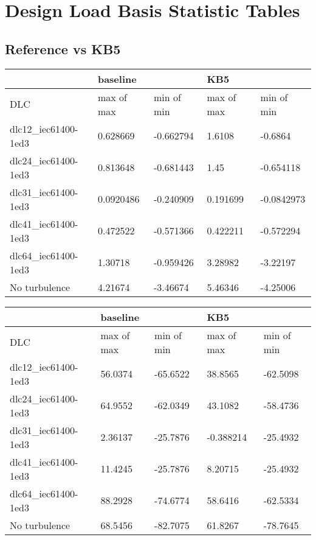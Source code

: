 \newpage
\chapter{Design Load Basis Statistic Tables}
\section{Reference vs KB5}
\label{tables:baseline-vs-KB6}

\begin{tabular}{lllll}
\toprule
                     & \multicolumn{2}{l}{baseline} &         KB5 &\\
\midrule
                 DLC &  max of max &  min of min &  max of max &  min of min \\
 dlc12\_iec61400-1ed3 &    0.628669 &   -0.662794 &      1.6108 &     -0.6864 \\
 dlc24\_iec61400-1ed3 &    0.813648 &   -0.681443 &        1.45 &   -0.654118 \\
 dlc31\_iec61400-1ed3 &   0.0920486 &   -0.240909 &    0.191699 &  -0.0842973 \\
 dlc41\_iec61400-1ed3 &    0.472522 &   -0.571366 &    0.422211 &   -0.572294 \\
 dlc64\_iec61400-1ed3 &     1.30718 &   -0.959426 &     3.28982 &    -3.22197 \\
    No turbulence &     4.21674 &    -3.46674 &     5.46346 &    -4.25006 \\
\bottomrule
\end{tabular}


\begin{tabular}{lllll}
\toprule
                     & \multicolumn{2}{l}{baseline} &         KB5 &\\
\midrule
                 DLC &  max of max &  min of min &  max of max &  min of min \\
 dlc12\_iec61400-1ed3 &     56.0374 &    -65.6522 &     38.8565 &    -62.5098 \\
 dlc24\_iec61400-1ed3 &     64.9552 &    -62.0349 &     43.1082 &    -58.4736 \\
 dlc31\_iec61400-1ed3 &     2.36137 &    -25.7876 &   -0.388214 &    -25.4932 \\
 dlc41\_iec61400-1ed3 &     11.4245 &    -25.7876 &     8.20715 &    -25.4932 \\
 dlc64\_iec61400-1ed3 &     88.2928 &    -74.6774 &     58.6416 &    -62.5334 \\
    No turbulence &     68.5456 &    -82.7075 &     61.8267 &    -78.7645 \\
\bottomrule
\end{tabular}


